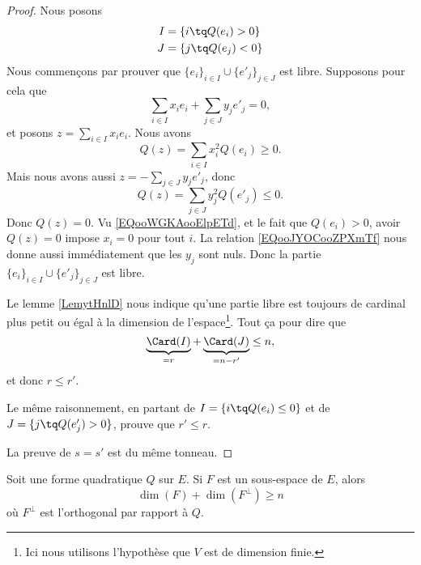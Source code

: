 \begin{proof}
    Nous posons    
    \begin{subequations}
        \begin{align}
            I&=\{ i\tq Q(e_i)>0 \}\\
            J&=\{ j\tq Q(e_j)<0 \}
        \end{align}
    \end{subequations}
    Nous commençons par prouver que \( \{ e_i \}_{i\in I}\cup\{ e'_j \}_{j\in J}\) est libre. Supposons pour cela que
    \begin{equation}
        \sum_{i\in I}x_ie_i+\sum_{j\in J}y_je'_j=0,
    \end{equation}
    et posons \( z=\sum_{i\in I}x_ie_i\). Nous avons
    \begin{equation}        \label{EQooWGKAooElpETd}
        Q(z)=\sum_{i\in I}x_i^2Q(e_i)\geq 0.
    \end{equation}
    Mais nous avons aussi \( z=-\sum_{j\in J}y_je'_j\), donc
    \begin{equation}        \label{EQooJYOCooZPXmTf}
        Q(z)=\sum_{j\in J}y_j^2Q(e'_j)\leq 0.
    \end{equation}
    Donc \( Q(z)=0\). Vu \eqref{EQooWGKAooElpETd}, et le fait que \( Q(e_i)>0\), avoir \( Q(z)=0\) impose \( x_i=0\) pour tout \( i\). La relation \eqref{EQooJYOCooZPXmTf} nous donne aussi immédiatement que les \( y_j\) sont nuls. Donc la partie \( \{ e_i \}_{i\in I}\cup\{ e'_j \}_{j\in J}\) est libre.

    Le lemme \ref{LemytHnlD} nous indique qu'une partie libre est toujours de cardinal plus petit ou égal à la dimension de l'espace\footnote{Ici nous utilisons l'hypothèse que \( V\) est de dimension finie.}. Tout ça pour dire que
    \begin{equation}
        \underbrace{\Card(I)}_{=r}+\underbrace{\Card(J)}_{=n-r'}\leq n,
    \end{equation}
    et donc \( r\leq r'\). 

    Le même raisonnement, en partant de \( I=\{ i\tq Q(e_i)\leq 0 \}\) et de \( J=\{ j\tq Q(e'_j)>0 \}\), prouve que \( r'\leq r\).

    La preuve de \( s=s'\) est du même tonneau.
\end{proof}

\begin{lemma}     \label{LEMooOQIDooPSOeXL}
    Soit une forme quadratique \( Q\) sur \( E\). Si \( F\) est un sous-espace de \( E\), alors
    \begin{equation}
        \dim(F)+\dim(F^{\perp})\geq n
    \end{equation}
    où \( F^{\perp}\) est l'orthogonal par rapport à \( Q\).
\end{lemma}

